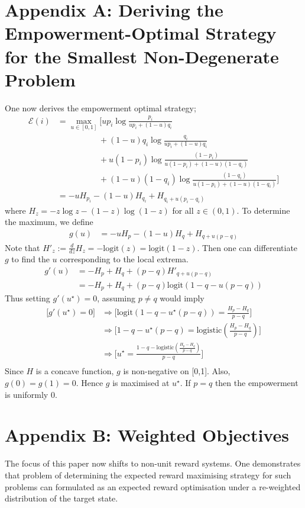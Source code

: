 \documentclass{article}
\newcommand{\Ee}{\mathcal{E}}
\begin{document}
\section*{Appendix A: Deriving the Empowerment-Optimal Strategy for the Smallest Non-Degenerate Problem}
One now derives the empowerment optimal strategy; 
\begin{align*}
\Ee(i) 
	&= \max_{u\in [0,1]}\bigg[up_i \log \frac{p_i}{up_i+(1-u)q_i}\\
	&\hspace{5em} + (1-u)q_i \log \frac{q_i}{up_i+(1-u)q_i}\\
	&\hspace{5em} + u(1-p_i) \log \frac{(1-p_i)}{u(1-p_i)+(1-u)(1-q_i)}\\
	&\hspace{5em} + (1-u)(1-q_i) \log \frac{(1-q_i)}{u(1-p_i)+(1-u)(1-q_i)}\bigg]\\
	&=-uH_{p_i}-(1-u)H_{q_i}+H_{q_i+u(p_i-q_i)}
\end{align*}
where $H_z=-z\log z - (1-z)\log(1-z)$ for all $z\in (0,1)$. To determine the maximum, we define 
\begin{align*}
g(u)&= -uH_{p}-(1-u)H_{q}+H_{q+u(p-q)} 
\end{align*}
Note that $H'_z:=\frac{d}{dz} H_z= -\text{logit}(z)=\text{logit}(1-z)$.
Then one can differentiate $g$ to find the $u$ corresponding to the local extrema.
\begin{align*}
g'(u) 
	&= -H_p + H_q + (p-q)H'_{q+u(p-q)}\\
	&= -H_p + H_q +(p-q)\text{logit}(1-q-u(p-q))
\end{align*}
Thus setting $g'(u^\star)=0$, assuming $p\neq q$ would imply
\begin{align*}
\bigg[g'(u^\star)=0\bigg]
	&\Rightarrow\bigg[\text{logit}(1-q-u^\star(p-q)) = \frac{H_{p}-H_{q}}{p-q}\bigg]\\
	&\Rightarrow\bigg[1-q-u^\star(p-q) = \text{logistic}\left(\frac{H_{p}-H_{q}}{p-q}\right)\bigg]\\
	&\Rightarrow\bigg[u^\star=\frac{1-q-\text{logistic}\left(\frac{H_{p}-H_{q}}{p-q}\right)}{p-q} \bigg]\\
\end{align*}
Since $H$ is a concave function, $g$ is non-negative on [0,1]. Also, $g(0)=g(1)=0$. Hence $g$ is maximised at $u^\star$. If $p=q$ then the empowerment is uniformly $0$.


\section*{Appendix B: Weighted Objectives}
The focus of this paper now shifts to non-unit reward systems. One demonstrates that problem of determining the expected reward maximising strategy for such problems can formulated as an expected reward optimisation under a re-weighted distribution of the target state.\vspace{1em}
\end{document}
